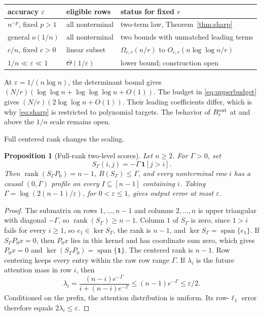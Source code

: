 \documentclass[10pt]{article} %
\newtheorem{proposition}[theorem]{Proposition}
\theoremstyle{definition}
\DeclareMathOperator{\rank}{rank}
\newcommand{\one}{\mathbf 1}
\begin{document}
\begin{center}
\begin{tabular}{lll}
\toprule
accuracy \(\varepsilon\) & eligible rows & status for fixed \(r\) \\
\midrule
\(n^{-p}\), fixed \(p>1\) & all nonterminal
 & two-term law, Theorem~\ref{thm:sharp} \\
general \(o(1/n)\) & all nonterminal
 & two bounds with unmatched leading terms \\
\(c/n\), fixed \(c>0\) & linear subset
 & \(\Omega_{c,r}(n/r)\) to \(O_{c,r}(n\log\log n/r)\) \\
\(1/n\ll\varepsilon\ll1\) & \(\Theta(1/\varepsilon)\)
 & lower bound; construction open \\
\bottomrule
\end{tabular}
\end{center}

At \(\varepsilon=1/(n\log n)\), the determinant bound gives
\((N/r)(\log\log n+\log\log\log n+O(1))\).  The budget in
\eqref{eq:upperbudget} gives \((N/r)(2\log\log n+O(1))\).  Their leading
coefficients differ, which is why \eqref{eq:sharp} is restricted to
polynomial targets.  The behavior of \(B^{\rm out}_r\) at and above the
\(1/n\) scale remains open.

Full centered rank changes the scaling.

\begin{proposition}[Full-rank two-level scores]\label{prop:fullrank}
Let \(n\ge2\).  For \(\Gamma>0\), set
\[
 S_\Gamma(i,j)=-\Gamma\,\mathbf1[j>i].
\]
Then \(\rank(S_\Gamma P_0)=n-1\), \(B(S_\Gamma)\le\Gamma\), and every
nonterminal row \(i\) has a causal \((0,\Gamma)\) profile on every
\(I\subseteq[n-1]\) containing \(i\).  Taking
\(\Gamma=\log(2(n-1)/\varepsilon)\), for \(0<\varepsilon\le1\), gives
output error at most \(\varepsilon\).
\end{proposition}

\begin{proof}
The submatrix on rows \(1,\ldots,n-1\) and columns \(2,\ldots,n\) is
upper triangular with diagonal \(-\Gamma\), so \(\rank(S_\Gamma)\ge n-1\).
Column \(1\) of \(S_\Gamma\) is zero, since \(1>i\) fails for every
\(i\ge1\), so \(e_1\in\ker S_\Gamma\), the rank is \(n-1\), and
\(\ker S_\Gamma=\operatorname{span}\{e_1\}\).  If
\(S_\Gamma P_0x=0\), then \(P_0x\) lies in this kernel and has coordinate
sum zero, which gives \(P_0x=0\) and
\(\ker(S_\Gamma P_0)=\operatorname{span}\{\one\}\).  The centered rank is
\(n-1\).  Row centering keeps every entry within the raw row range
\(\Gamma\).  If \(\lambda_i\) is the future attention mass in row \(i\), then
\[
 \lambda_i=\frac{(n-i)e^{-\Gamma}}{i+(n-i)e^{-\Gamma}}
 \le(n-1)e^{-\Gamma}\le\varepsilon/2.
\]
Conditioned on the prefix, the attention distribution is uniform.  Its
row-\(\ell_1\) error therefore equals \(2\lambda_i\le\varepsilon\).
\end{proof}
\end{document}
